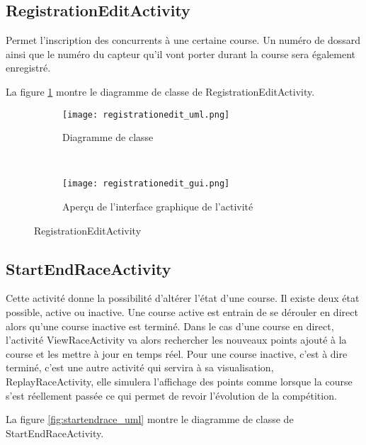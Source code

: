 \subsection{RegistrationEditActivity}

Permet l'inscription des concurrents à une certaine course. Un numéro de dossard ainsi que le numéro du capteur qu'il vont porter durant la course sera également enregistré.

La figure \ref{fig:registrationedit_uml} montre le diagramme de classe de RegistrationEditActivity.

\begin{figure}[htb!]
    \centering
    \begin{subfigure}[htb]{0.49\textwidth}
		\texttt{[image: registrationedit\_uml.png]} 
		\caption{Diagramme de classe}
		\label{fig:registrationedit_uml}
    \end{subfigure}
    ~ %
    \begin{subfigure}[htb]{0.49\textwidth}
		\texttt{[image: registrationedit\_gui.png]} 
		\caption{Aperçu de l'interface graphique de l'activité}
		\label{fig:registrationedit_gui}
    \end{subfigure}
    \caption{RegistrationEditActivity}\label{fig:registrationedit_fig}
\end{figure}

\subsection{StartEndRaceActivity}

Cette activité donne la possibilité d'altérer l'état d'une course. Il existe deux état possible, active ou inactive. Une course active est entrain de se dérouler en direct alors qu'une course inactive est terminé. Dans le cas d'une course en direct, l'activité ViewRaceActivity va alors rechercher les nouveaux points ajouté à la course et les mettre à jour en temps réel. Pour une course inactive, c'est à dire terminé, c'est une autre activité qui servira à sa visualisation, ReplayRaceActivity, elle simulera l'affichage des points comme lorsque la course s'est réellement passée ce qui permet de revoir l'évolution de la compétition.

La figure \ref{fig:startendrace_uml} montre le diagramme de classe de StartEndRaceActivity.

